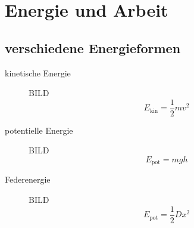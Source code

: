 \section{Energie und Arbeit}
\subsection{verschiedene Energieformen}
\begin{description}
	\item[kinetische Energie] BILD
		\[ E_{\text{kin}} = \frac{1}{2} m v^2 \]
	\item[potentielle Energie] BILD
		\[ E_{\text{pot}} = mgh \]
	\item[Federenergie] BILD
		\[ E_{\text{pot}} = \frac{1}{2} D x^2 \]
\end{description}

